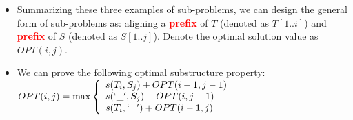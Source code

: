 \documentclass[mathserif]{beamer}
\begin{document}
{\begin{itemize}
\begin{figure}
\begin{tikzpicture}[scale=0.8, auto,swap]
   \end{tikzpicture}
\end{figure}


\item Summarizing these three examples of sub-problems, we can design the general form of sub-problems as: aligning a \textcolor{red}{\bf prefix} of $T$ (denoted as $T[1..i]$) and \textcolor{red}{\bf prefix}  of $S$ (denoted as $S[1..j]$). Denote the optimal solution value as $OPT(i,j)$. 
 \item We can prove the following optimal substructure property: \\
 $OPT( i, j) = \max  \left \{\begin{array}{ll}  s(T_i, S_j) + OPT(i-1, j-1) &  \\  
  s(`\_', S_j) + OPT(i, j-1) & \\  
 s(T_i,`\_') + OPT(i-1,j) &  \end{array}  
 \right. $
\end{itemize}

}

\end{document}
